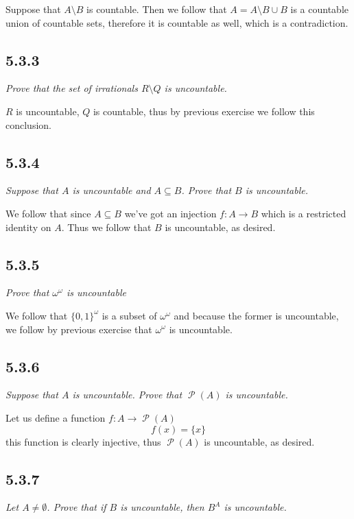 \documentclass[11pt,oneside,titlepage]{book}
\DeclareMathOperator \pow {\mathcal {P}}
\begin{document}
Suppose that $A \setminus B$ is countable. Then we follow that $A = A \setminus B \cup B$
is a countable union of countable sets, therefore it is countable as well, which
is a contradiction.

\subsection*{5.3.3}

\textit{Prove that the set of irrationals $R \setminus Q$ is uncountable.}

$R$ is uncountable, $Q$ is countable, thus by previous exercise we follow this
conclusion.

\subsection*{5.3.4}

\textit{Suppose that $A$ is uncountable and $A \subseteq B$. Prove that $B$ is
  uncountable.}

We follow that since $A \subseteq B$ we've got an injection $f: A \to B$
which is a restricted identity on $A$. Thus we follow that $B$ is uncountable, as desired.

\subsection*{5.3.5}

\textit{Prove that $\omega^\omega$ is uncountable}

We follow that $\{0, 1\}^\omega$ is a subset of $\omega^{\omega}$ and because the former
is uncountable, we follow by previous exercise that $\omega^{\omega}$ is uncountable.

\subsection*{5.3.6}

\textit{Suppose that $A$ is uncountable. Prove that $\pow(A)$ is uncountable.}

Let us define a function $f: A \to \pow(A)$
$$f(x) = \{x\}$$
this function is clearly injective, thus $\pow(A)$ is uncountable, as desired.

\subsection*{5.3.7}

\textit{Let $A \neq \emptyset$. Prove that if $B$ is uncountable, then $B^A$ is uncountable.}
\end{document}
